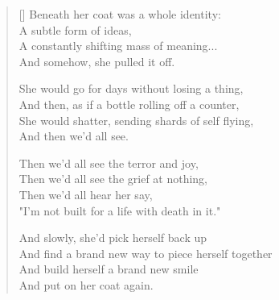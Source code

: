 \begin{verse}[\textwidth]
Beneath her coat was a whole identity:\\
A subtle form of ideas,\\
A constantly shifting mass of meaning...\\
And somehow, she pulled it off.

She would go for days without losing a thing,\\
And then, as if a bottle rolling off a counter,\\
She would shatter, sending shards of self flying,\\
And then we'd all see.

Then we'd all see the terror and joy,\\
Then we'd all see the grief at nothing,\\
Then we'd all hear her say,\\
"I'm not built for a life with death in it."

And slowly, she'd pick herself back up\\
And find a brand new way to piece herself together\\
And build herself a brand new smile\\
And put on her coat again.
\end{verse}
